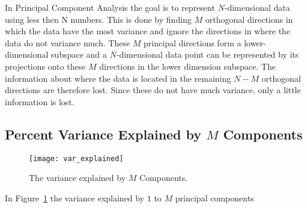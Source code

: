 
In Principal Component Analysis the goal is to represent $N$-dimensional data using less then N numbers. This is done by finding $M$ orthogonal directions in which the data have the most variance and ignore the directions in where the data do not variance much. These $M$ principal directions form a lower-dimensional subspace and a $N$-dimensional data point can be represented by its projections onto these $M$ directions in the lower dimension subspace. The information about where the data is located in the remaining $N-M$ orthogonal directions are therefore lost. Since these do not have much variance, only a little information is lost.

\subsection{Percent Variance Explained by $M$ Components}
\begin{figure}[hbtp]
\centering
\texttt{[image: var\_explained]}
\caption{The variance explained by $M$ Components.\label{fig:pca_var_explained}}
\end{figure}

In Figure~\ref{fig:pca_var_explained} the variance explained by $1$ to $M$ principal components 
